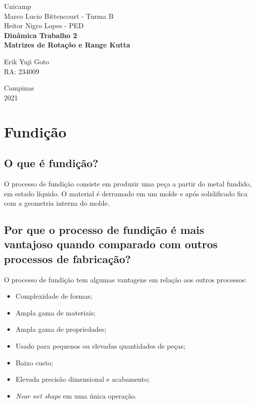 \documentclass[a4paper, 12pt]{article}
\begin{document}
%
\begin{titlepage} %
	\begin{center} %
		{\large Unicamp}\\[0.4cm] %
		{\large Marco Lucio Bittencourt - Turma B}\\
		{\large Heitor Nigro Lopes - PED}\\[3.2cm]
		{\bf \huge Dinâmica Trabalho 2}\\[0.2cm] 
		{\bf \large Matrizes de Rotação e Range Kutta}\\[4.9cm]
	\end{center} %
	{\large Erik Yuji Goto}\\ %
	RA: 234009\\[10cm]
	\begin{center}
	
		{\large Campinas}\\[0.2cm]
		{\large 2021}
	\end{center}
\end{titlepage} %


\tableofcontents
\newpage

\section{Fundição}
	\subsection{O que é fundição?}
	O processo de fundição consiste em produzir uma peça a partir do metal fundido, em estado líquido. O material é derramado em um molde e após solidificado fica com a geometria interna do molde.
	
	\subsection{Por que o processo de fundição é mais vantajoso quando comparado com outros processos de fabricação?}
	O processo de fundição tem algumas vantagens em relação aos outros processos:
	\begin{itemize}
		\item Complexidade de formas;
		\item Ampla gama de materiais;
		\item Ampla gama de propriedades;
		\item Usado para pequenos ou elevadas quantidades de peças;
		\item Baixo custo;
		\item Elevada precisão dimensional e acabamento;
		\item \textit{Near net shape} em uma única operação. 
	\end{itemize}
\end{document}
